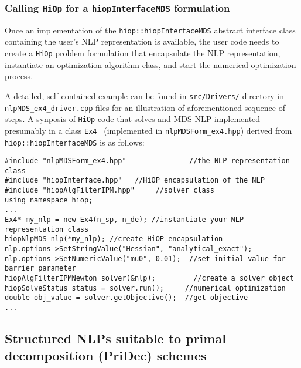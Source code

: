 \documentclass[11pt]{article}
\newcommand{\Hi}{\texttt{HiOp}\xspace}
\begin{document}
\subsubsection{Calling \Hi for a \texttt{hiopInterfaceMDS} formulation}
Once an implementation of the \texttt{hiop::hiopInterfaceMDS} abstract interface class containing the user's NLP representation is available, the  user code needs to create a \Hi problem formulation that encapsulate the NLP representation, instantiate an optimization algorithm class, and start the numerical optimization process. 

A detailed, self-contained example can be found in \texttt{src/Drivers/} directory in \texttt{nlpMDS\_ex4\_driver.cpp} files for an illustration of aforementioned sequence of steps. A synposis of \Hi code that solves and MDS NLP implemented presumably in a class \texttt{Ex4 } (implemented in \texttt{nlpMDSForm\_ex4.hpp}) derived from \texttt{hiop::hiopInterfaceMDS} is as follows:
\begin{lstlisting}
#include "nlpMDSForm_ex4.hpp"               //the NLP representation class
#include "hiopInterface.hpp"   //HiOP encapsulation of the NLP
#include "hiopAlgFilterIPM.hpp"     //solver class
using namespace hiop;
...
Ex4* my_nlp = new Ex4(n_sp, n_de); //instantiate your NLP representation class                    
hiopNlpMDS nlp(*my_nlp); //create HiOP encapsulation
nlp.options->SetStringValue("Hessian", "analytical_exact");
nlp.options->SetNumericValue("mu0", 0.01);  //set initial value for  barrier parameter
hiopAlgFilterIPMNewton solver(&nlp);         //create a solver object
hiopSolveStatus status = solver.run();     //numerical optimization
double obj_value = solver.getObjective();  //get objective
...
\end{lstlisting}


\subsection{Structured NLPs suitable to primal decomposition (PriDec) schemes}\label{sec:pridec}
\end{document}
